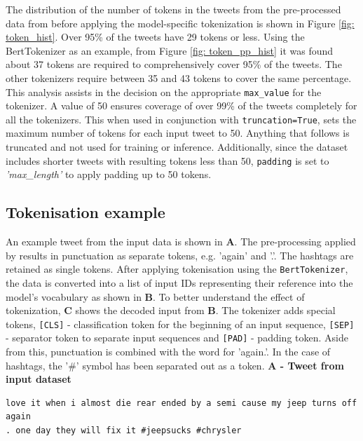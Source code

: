 The distribution of the number of tokens in the tweets from the pre-processed data from \cite{preotiuc-pietro_automatically_2019,jinModelingSeverityComplaints2021} before applying the model-specific tokenization is shown in Figure \ref{fig: token_hist}. Over 95\% of the tweets have 29 tokens or less. Using the BertTokenizer as an example, from Figure \ref{fig: token_pp_hist} it was found about 37 tokens are required to comprehensively cover 95\% of the tweets. The other tokenizers require between 35 and 43 tokens to cover the same percentage. This analysis assists in the decision on the appropriate \texttt{max\_value} for the tokenizer. A value of 50 ensures coverage of over 99\% of the tweets completely for all the tokenizers. This when used in conjunction with \texttt{truncation=True}, sets the maximum number of tokens for each input tweet to 50. Anything that follows is truncated and not used for training or inference. Additionally, since the dataset includes shorter tweets with resulting tokens less than 50, \texttt{padding} is set to \emph{'max\_length'} to apply padding up to 50 tokens.


\subsection{Tokenisation example}
An example tweet from the input data is shown in \textbf{A}. The pre-processing applied by \cite{preotiuc-pietro_automatically_2019,jinModelingSeverityComplaints2021} results in punctuation as separate tokens, e.g. 'again' and '.'. The hashtags are retained as single tokens. After applying tokenisation using the \texttt{BertTokenizer}, the data is converted into a list of input IDs representing their reference into the model's vocabulary as shown in \textbf{B}. To better understand the effect of tokenization, \textbf{C} shows the decoded input from \textbf{B}. The tokenizer adds special tokens, \texttt{[CLS]} - classification token for the beginning of an input sequence, \texttt{[SEP]} - separator token to separate input sequences and \texttt{[PAD]} - padding token. Aside from this, punctuation is combined with the word for 'again.'. In the case of hashtags, the '\#' symbol has been separated out as a token.\newline\newline
\textbf{A - Tweet from input dataset}\newline

\begin{adjustbox}{minipage={\textwidth},fbox}
    \begin{verbatim}love it when i almost die rear ended by a semi cause my jeep turns off again 
. one day they will fix it #jeepsucks #chrysler\end{verbatim}
\end{adjustbox} \newline\newline

